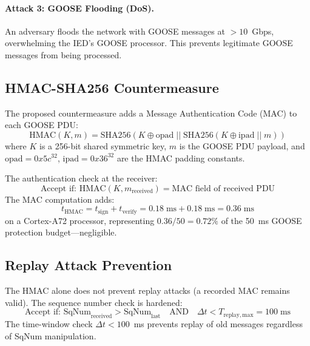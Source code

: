 \paragraph{Attack 3: GOOSE Flooding (DoS).}
An adversary floods the network with GOOSE messages at $> 10$~Gbps,
overwhelming the IED's GOOSE processor. This prevents legitimate
GOOSE messages from being processed.

\subsection{HMAC-SHA256 Countermeasure}

The proposed countermeasure adds a Message Authentication Code (MAC)
to each GOOSE PDU:
\begin{equation}
  \mathrm{HMAC}(K, m) = \mathrm{SHA256}\!\left(K \oplus \mathrm{opad}\;||\;
    \mathrm{SHA256}(K \oplus \mathrm{ipad}\;||\; m)\right)
  \label{eq:ch9_hmac}
\end{equation}
where $K$ is a 256-bit shared symmetric key, $m$ is the GOOSE PDU payload,
and $\mathrm{opad} = 0x5c^{32}$, $\mathrm{ipad} = 0x36^{32}$ are the
HMAC padding constants.

The authentication check at the receiver:
\begin{equation}
  \text{Accept if: } \mathrm{HMAC}(K, m_\mathrm{received}) =
    \text{MAC field of received PDU}
  \label{eq:ch9_hmac_check}
\end{equation}
The MAC computation adds:
\begin{equation}
  t_\mathrm{HMAC} = t_\mathrm{sign} + t_\mathrm{verify}
  = 0.18\;\mathrm{ms} + 0.18\;\mathrm{ms} = 0.36\;\mathrm{ms}
  \label{eq:ch9_hmac_latency}
\end{equation}
on a Cortex-A72 processor, representing $0.36/50 = 0.72\%$ of the
50~ms GOOSE protection budget—negligible.

\subsection{Replay Attack Prevention}

The HMAC alone does not prevent replay attacks (a recorded MAC remains
valid). The sequence number check is hardened:
\begin{equation}
  \text{Accept if: } \mathrm{SqNum}_\mathrm{received} >
    \mathrm{SqNum}_\mathrm{last}
  \quad\text{AND}\quad
  \Delta t < T_\mathrm{replay,max} = 100\;\mathrm{ms}
  \label{eq:ch9_replay}
\end{equation}
The time-window check $\Delta t < 100$~ms prevents replay of old
messages regardless of SqNum manipulation.

